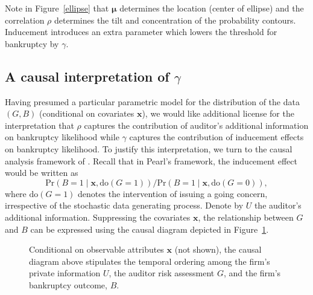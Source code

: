 \documentclass[aoas,preprint, 11pt, dvipsnames, table, x11name]{imsart}
\renewcommand{\bm}[1]{\mathbf{#1}}
\theoremstyle{remark}
\begin{document}
	Note in Figure~\ref{ellipse} that $\bm{\mu}$ determines the location (center of ellipse) and the correlation $\rho$ determines the tilt and concentration of the probability contours. Inducement introduces an extra parameter which lowers the threshold for bankruptcy by $\gamma$.  
	
	\subsection{A causal interpretation of $\gamma$}
	
	Having presumed a particular parametric model for the distribution of the data $(G,B)$ (conditional on covariates $\mathbf{x}$), we would like additional license for the interpretation that $\rho$ captures the contribution of auditor's additional information on bankruptcy likelihood while $\gamma$ captures the contribution of inducement effects on bankruptcy likelihood. To justify this interpretation, we turn to the causal analysis framework of \cite{pearl-2000}. Recall that in Pearl's framework, the inducement effect would be written as 
	\begin{equation}\label{docalc}
		\mbox{Pr}(B = 1 \mid \mathbf{x}, \text{do}(G = 1)) / \mbox{Pr}(B = 1 \mid \mathbf{x}, \text{do}(G = 0)),
	\end{equation}
	where $\text{do}(G=1)$ denotes the intervention of issuing a going concern, irrespective of the stochastic data generating process. Denote by $U$ the auditor's additional information.  Suppressing the covariates $\mathbf{x}$, the relationship between $G$ and $B$ can be expressed using the causal diagram depicted in Figure~\ref{causaldiag}.
	
	\begin{figure}[h!]
		\caption{Conditional on observable attributes $\mathbf{x}$ (not shown), the causal diagram above stipulates the temporal ordering among the firm's private information $U$, the auditor risk assessment $G$, and the firm's bankruptcy outcome, $B$.}\label{causaldiag} 
	\end{figure}
	
\end{document}
